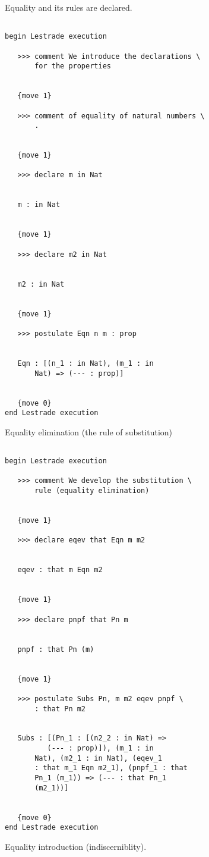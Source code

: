 \documentclass[12pt]{article}
\begin{document}
Equality and its rules are declared.

\begin{verbatim}

begin Lestrade execution

   >>> comment We introduce the declarations \
       for the properties


   {move 1}

   >>> comment of equality of natural numbers \
       .


   {move 1}

   >>> declare m in Nat


   m : in Nat


   {move 1}

   >>> declare m2 in Nat


   m2 : in Nat


   {move 1}

   >>> postulate Eqn n m : prop


   Eqn : [(n_1 : in Nat), (m_1 : in 
       Nat) => (--- : prop)]


   {move 0}
end Lestrade execution
\end{verbatim}

Equality elimination (the rule of substitution)

\begin{verbatim}

begin Lestrade execution

   >>> comment We develop the substitution \
       rule (equality elimination)


   {move 1}

   >>> declare eqev that Eqn m m2


   eqev : that m Eqn m2


   {move 1}

   >>> declare pnpf that Pn m


   pnpf : that Pn (m)


   {move 1}

   >>> postulate Subs Pn, m m2 eqev pnpf \
       : that Pn m2


   Subs : [(Pn_1 : [(n2_2 : in Nat) => 
          (--- : prop)]), (m_1 : in 
       Nat), (m2_1 : in Nat), (eqev_1 
       : that m_1 Eqn m2_1), (pnpf_1 : that 
       Pn_1 (m_1)) => (--- : that Pn_1 
       (m2_1))]


   {move 0}
end Lestrade execution
\end{verbatim}

Equality introduction (indiscerniblity).
\end{document}
